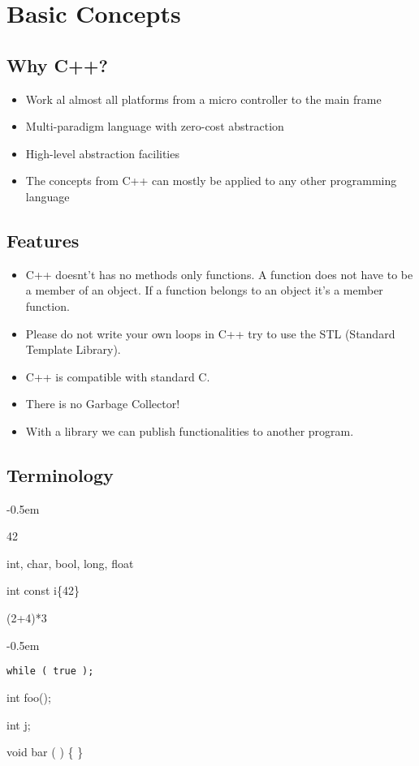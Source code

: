 

\section{Basic Concepts}
\subsection{Why C++?}
\begin{itemize}
  \itemsep -0.5em 
  \item Work al almost all platforms from a micro controller to the main frame
  \item Multi-paradigm language with zero-cost abstraction
  \item High-level abstraction facilities
  \item The concepts from C++ can mostly be applied to any other programming language
\end{itemize}

\subsection{Features}
\begin{itemize}
  \itemsep -0.5em 
  \item C++ doesnt't has no methods only functions. A function does not have to be a member of an object. If a function belongs to an object it's a member function.
  \item Please do not write your own loops in C++ try to use the STL (Standard Template Library).
  \item C++ is compatible with standard C.
  \item There is no Garbage Collector!
  \item With a library we can publish functionalities to another program.
\end{itemize}

\subsection{Terminology}
\begin{minipage}{0,5\linewidth}
	\begin{description}
		\itemsep -0.5em
		\item[Value] 42
  		\item[Type] int, char, bool, long, float
  		\item[Variable] int const i\{42\}
  		\item[Expression] (2+4)*3
	\end{description}  
\end{minipage}
\begin{minipage}{0,5\linewidth}
	\begin{description}
		\itemsep -0.5em
   		\item[Statement] \lstinline|while ( true );|
  		\item[Declaration] int foo();
  		\item [Definition] int j;
  		\item [Function] void bar ( ) \{ \}
	\end{description}  
\end{minipage}


